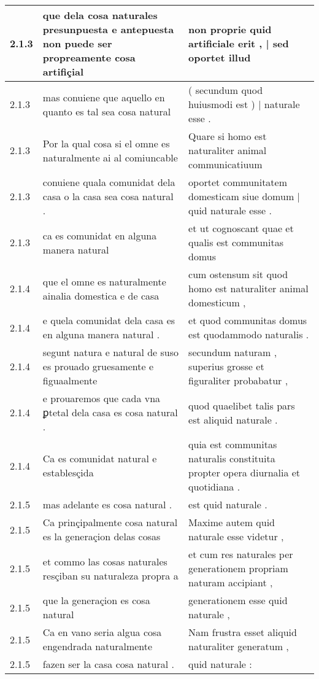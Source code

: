 \begin{tabular}{|p{1cm}|p{6.5cm}|p{6.5cm}|}
2.1.3 & que dela cosa naturales presunpuesta e antepuesta non puede ser propreamente cosa artifiçial & non proprie quid artificiale erit , | sed oportet illud \\\hline
2.1.3 & mas conuiene que aquello en quanto es tal sea cosa natural & ( secundum quod huiusmodi est ) | naturale esse . \\\hline
2.1.3 & Por la qual cosa si el omne es naturalmente ai al comiuncable & Quare si homo est naturaliter animal communicatiuum \\\hline
2.1.3 & conuiene quala comunidat dela casa o la casa sea cosa natural . & oportet communitatem domesticam siue domum | quid naturale esse . \\\hline
2.1.3 & ca es comunidat en alguna manera natural & et ut cognoscant quae et qualis est communitas domus \\\hline
2.1.4 & que el omne es naturalmente ainalia domestica e de casa & cum ostensum sit quod homo est naturaliter animal domesticum , \\\hline
2.1.4 & e quela comunidat dela casa es en alguna manera natural . & et quod communitas domus est quodammodo naturalis . \\\hline
2.1.4 & segunt natura e natural de suso es prouado gruesamente e figuaalmente & secundum naturam , superius grosse et figuraliter probabatur , \\\hline
2.1.4 & e prouaremos que cada vna ꝑtetal dela casa es cosa natural . & quod quaelibet talis pars est aliquid naturale . \\\hline
2.1.4 & Ca es comunidat natural e establesçida & quia est communitas naturalis constituita propter opera diurnalia et quotidiana . \\\hline
2.1.5 & mas adelante es cosa natural . & est quid naturale . \\\hline
2.1.5 & Ca prinçipalmente cosa natural es la generaçion delas cosas & Maxime autem quid naturale esse videtur , \\\hline
2.1.5 & et commo las cosas naturales resçiban su naturaleza propra a & et cum res naturales per generationem propriam naturam accipiant , \\\hline
2.1.5 & que la generaçion es cosa natural & generationem esse quid naturale , \\\hline
2.1.5 & Ca en vano seria algua cosa engendrada naturalmente & Nam frustra esset aliquid naturaliter generatum , \\\hline
2.1.5 & fazen ser la casa cosa natural . & quid naturale : \\\hline

\end{tabular}
